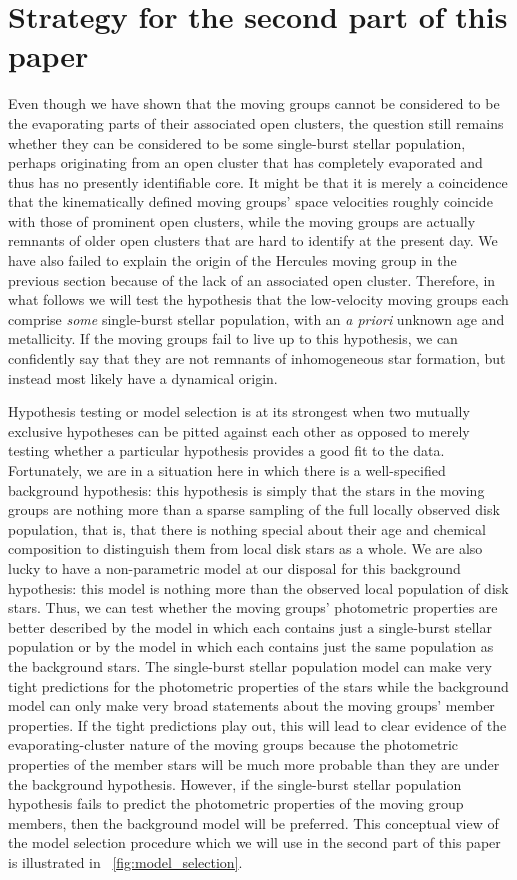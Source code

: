 \section{Strategy for the second part of this paper}\label{sec:strategy}

Even though we have shown that the moving groups cannot be considered
to be the evaporating parts of their associated open clusters, the
question still remains whether they can be considered to be some
single-burst stellar population, perhaps originating from an open
cluster that has completely evaporated and thus has no presently
identifiable core. It might be that it is merely a coincidence that
the kinematically defined moving groups' space velocities roughly
coincide with those of prominent open clusters, while the moving
groups are actually remnants of older open clusters that are hard to
identify at the present day. We have also failed to explain the origin
of the Hercules moving group in the previous section because of the
lack of an associated open cluster. Therefore, in what follows we will
test the hypothesis that the low-velocity moving groups each comprise
\emph{some} single-burst stellar population, with an \emph{a priori}
unknown age and metallicity. If the moving groups fail to live up to
this hypothesis, we can confidently say that they are not remnants of
inhomogeneous star formation, but instead most likely have a dynamical
origin.

Hypothesis testing or model selection is at its strongest when two
mutually exclusive hypotheses can be pitted against each other as
opposed to merely testing whether a particular hypothesis provides a
good fit to the data. Fortunately, we are in a situation here in which
there is a well-specified background hypothesis: this hypothesis is
simply that the stars in the moving groups are nothing more than a
sparse sampling of the full locally observed disk population, that is,
that there is nothing special about their age and chemical composition
to distinguish them from local disk stars as a whole. We are also
lucky to have a non-parametric model at our disposal for this
background hypothesis: this model is nothing more than the observed
local population of disk stars. Thus, we can test whether the moving
groups' photometric properties are better described by the model in
which each contains just a single-burst stellar population or by the
model in which each contains just the same population as the
background stars. The single-burst stellar population model can make
very tight predictions for the photometric properties of the stars
while the background model can only make very broad statements about
the moving groups' member properties. If the tight predictions play
out, this will lead to clear evidence of the evaporating-cluster
nature of the moving groups because the photometric properties of the
member stars will be much more probable than they are under the
background hypothesis. However, if the single-burst stellar population
hypothesis fails to predict the photometric properties of the moving
group members, then the background model will be preferred. This
conceptual view of the model selection procedure which we will use in
the second part of this paper is illustrated in
\figurename~\ref{fig:model_selection}.

